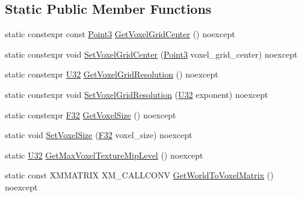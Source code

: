 \subsection*{Static Public Member Functions}
\begin{DoxyCompactItemize}
\item 
static constexpr const \mbox{\hyperlink{structmage_1_1_point3}{Point3}} \mbox{\hyperlink{classmage_1_1rendering_1_1_voxelization_settings_af246454d2acf7f7f37edaa2ac6d64458}{Get\+Voxel\+Grid\+Center}} () noexcept
\item 
static constexpr void \mbox{\hyperlink{classmage_1_1rendering_1_1_voxelization_settings_aadb28ee2786ec5f84f6b4d22ae8ddf57}{Set\+Voxel\+Grid\+Center}} (\mbox{\hyperlink{structmage_1_1_point3}{Point3}} voxel\+\_\+grid\+\_\+center) noexcept
\item 
static constexpr \mbox{\hyperlink{namespacemage_aa5d6eaabaac3cdd01873d6a3d27e90f3}{U32}} \mbox{\hyperlink{classmage_1_1rendering_1_1_voxelization_settings_a0a940986058f36311aea31331cb18c14}{Get\+Voxel\+Grid\+Resolution}} () noexcept
\item 
static constexpr void \mbox{\hyperlink{classmage_1_1rendering_1_1_voxelization_settings_a106df60538c535ffad8d42b5db49e59a}{Set\+Voxel\+Grid\+Resolution}} (\mbox{\hyperlink{namespacemage_aa5d6eaabaac3cdd01873d6a3d27e90f3}{U32}} exponent) noexcept
\item 
static constexpr \mbox{\hyperlink{namespacemage_aa97e833b45f06d60a0a9c4fc22ae02c0}{F32}} \mbox{\hyperlink{classmage_1_1rendering_1_1_voxelization_settings_a510d2c8d3d5ebcb88617a0e717f64723}{Get\+Voxel\+Size}} () noexcept
\item 
static void \mbox{\hyperlink{classmage_1_1rendering_1_1_voxelization_settings_a4e1c575474a1301981bc0a0070c2c841}{Set\+Voxel\+Size}} (\mbox{\hyperlink{namespacemage_aa97e833b45f06d60a0a9c4fc22ae02c0}{F32}} voxel\+\_\+size) noexcept
\item 
static \mbox{\hyperlink{namespacemage_aa5d6eaabaac3cdd01873d6a3d27e90f3}{U32}} \mbox{\hyperlink{classmage_1_1rendering_1_1_voxelization_settings_aacf64e0e4be2e7260793dfefe7f332cb}{Get\+Max\+Voxel\+Texture\+Mip\+Level}} () noexcept
\item 
static const X\+M\+M\+A\+T\+R\+IX X\+M\+\_\+\+C\+A\+L\+L\+C\+O\+NV \mbox{\hyperlink{classmage_1_1rendering_1_1_voxelization_settings_ac0eb16df3bfae7218b27e1c1cdf1399f}{Get\+World\+To\+Voxel\+Matrix}} () noexcept
\end{DoxyCompactItemize}
